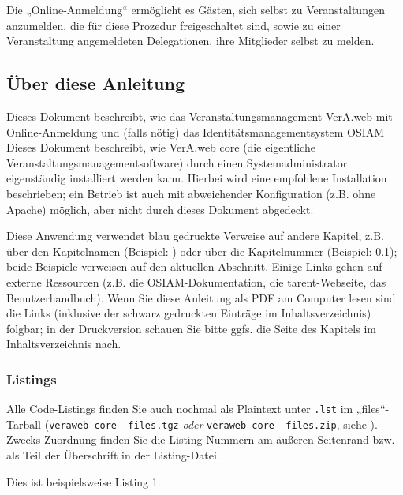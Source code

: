 \ifoa
Die „Online-Anmeldung“ ermöglicht es Gästen, sich selbst zu Veranstaltungen
anzumelden, die für diese Prozedur freigeschaltet sind, sowie zu einer
Veranstaltung angemeldeten Delegationen, ihre Mitglieder selbst zu melden.
\fi%

\subsection{Über diese Anleitung}\label{subsec:aboutmanual}

\ifoa
Dieses Dokument beschreibt, wie das Veranstaltungsmanagement
VerA.web mit Online-Anmeldung und (falls nötig) das
Identitätsmanagementsystem OSIAM
\else%
Dieses Dokument beschreibt, wie VerA.web core (die eigentliche
Veranstaltungsmanagementsoftware)
\fi%
durch einen Systemadministrator
eigenständig installiert werden kann. Hierbei wird eine empfohlene
Installation beschrieben; ein Betrieb ist auch mit abweichender
Konfiguration (z.B. ohne Apache) möglich, aber nicht durch dieses
Dokument abgedeckt.

Diese Anwendung verwendet blau gedruckte Verweise auf andere Kapitel,
z.B. über den Kapitelnamen (Beispiel: )
oder über die Kapitelnummer (Beispiel: \ref{subsec:aboutmanual});
beide Beispiele verweisen auf den aktuellen Abschnitt. Einige Links
gehen auf externe Ressourcen (z.B. die OSIAM-Dokumentation, die
tarent-Webseite, das Benutzerhandbuch). Wenn Sie diese Anleitung als
PDF am Computer lesen sind die Links (inklusive der schwarz gedruckten
Einträge im Inhaltsverzeichnis) folgbar; in der Druckversion schauen
Sie bitte ggfs. die Seite des Kapitels im Inhaltsverzeichnis nach.

\subsubsection{Listings}\label{subsubsec:aboutmanual-lst}

\begin{minipage}{\textwidth}
Alle Code-Listings finden Sie auch nochmal als Plaintext unter
\texttt{\jobname.lst} im „files“-Tarball
(\texttt{veraweb-core-\vwiaverssw{}-files.tgz} \emph{oder}
\texttt{veraweb-core-\vwiaverssw{}-files.zip}, siehe
).
Zwecks Zuordnung finden Sie die Listing-Nummern am äußeren
Seitenrand bzw. als Teil der Überschrift in der Listing-Datei.

\begin{lstdumpx}
Dies ist beispielsweise Listing 1.
\end{lstdumpx}
\end{minipage}

